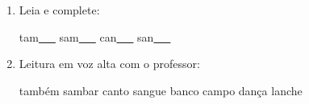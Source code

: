 \begin{exercicio}
\begin{enumerate}[resume]
\begin{enumerate}[label=(\alph*)]
    \item O som da unidade é: ( ) oral ( ) nasal 

    \item A primeira sílaba de TAMBÉM é: ( ) AM ( ) AN

    \item As palavras da unidade aparecem: ( ) no início ( ) no meio ( ) no fim das palavras

  \end{enumerate}

  \item Leia e complete:
  \begin{center}
  tam\underline{~~~} \quad sam\underline{~~~} \quad can\underline{~~~} \quad san\underline{~~~}
  \end{center}

  \item Leitura em voz alta com o professor:
  \begin{center}
  também \quad sambar \quad canto \quad sangue \quad banco \quad campo \quad dança \quad lanche
  \end{center}

\end{enumerate}

\end{exercicio}




